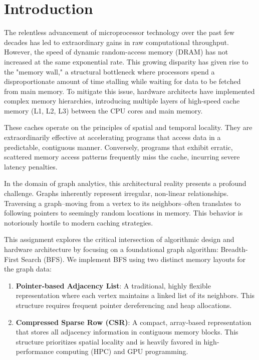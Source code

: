 \documentclass[11pt]{article}
\begin{document}
\tableofcontents
\newpage

\section{Introduction}

The relentless advancement of microprocessor technology over the past few decades has led to extraordinary gains in raw computational throughput. However, the speed of dynamic random-access memory (DRAM) has not increased at the same exponential rate. This growing disparity has given rise to the "memory wall," a structural bottleneck where processors spend a disproportionate amount of time stalling while waiting for data to be fetched from main memory. To mitigate this issue, hardware architects have implemented complex memory hierarchies, introducing multiple layers of high-speed cache memory (L1, L2, L3) between the CPU cores and main memory.

These caches operate on the principles of spatial and temporal locality. They are extraordinarily effective at accelerating programs that access data in a predictable, contiguous manner. Conversely, programs that exhibit erratic, scattered memory access patterns frequently miss the cache, incurring severe latency penalties.

In the domain of graph analytics, this architectural reality presents a profound challenge. Graphs inherently represent irregular, non-linear relationships. Traversing a graph--moving from a vertex to its neighbors--often translates to following pointers to seemingly random locations in memory. This behavior is notoriously hostile to modern caching strategies.

This assignment explores the critical intersection of algorithmic design and hardware architecture by focusing on a foundational graph algorithm: Breadth-First Search (BFS). We implement BFS using two distinct memory layouts for the graph data:
\begin{enumerate}
    \item \textbf{Pointer-based Adjacency List}: A traditional, highly flexible representation where each vertex maintains a linked list of its neighbors. This structure requires frequent pointer dereferencing and heap allocations.
    \item \textbf{Compressed Sparse Row (CSR)}: A compact, array-based representation that stores all adjacency information in contiguous memory blocks. This structure prioritizes spatial locality and is heavily favored in high-performance computing (HPC) and GPU programming.
\end{enumerate}
\end{document}
